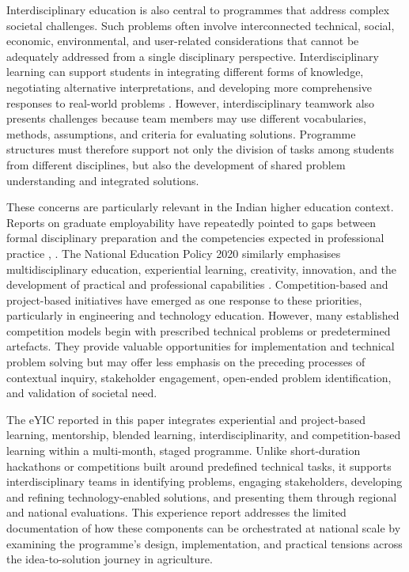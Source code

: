 \documentclass[runningheads]{llncs}
\begin{document}
Interdisciplinary education is also central to programmes that address complex societal challenges. Such problems often involve interconnected technical, social, economic, environmental, and user-related considerations that cannot be adequately addressed from a single disciplinary perspective. Interdisciplinary learning can support students in integrating different forms of knowledge, negotiating alternative interpretations, and developing more comprehensive responses to real-world problems \cite{b26}. However, interdisciplinary teamwork also presents challenges because team members may use different vocabularies, methods, assumptions, and criteria for evaluating solutions. Programme structures must therefore support not only the division of tasks among students from different disciplines, but also the development of shared problem understanding and integrated solutions.

These concerns are particularly relevant in the Indian higher education context. Reports on graduate employability have repeatedly pointed to gaps between formal disciplinary preparation and the competencies expected in professional practice \cite{b27}, \cite{b28}. The National Education Policy 2020 similarly emphasises multidisciplinary education, experiential learning, creativity, innovation, and the development of practical and professional capabilities \cite{b29}. Competition-based and project-based initiatives have emerged as one response to these priorities, particularly in engineering and technology education. However, many established competition models begin with prescribed technical problems or predetermined artefacts. They provide valuable opportunities for implementation and technical problem solving but may offer less emphasis on the preceding processes of contextual inquiry, stakeholder engagement, open-ended problem identification, and validation of societal need.

The eYIC reported in this paper integrates experiential and project-based learning, mentorship, blended learning, interdisciplinarity, and competition-based learning within a multi-month, staged programme. Unlike short-duration hackathons or competitions built around predefined technical tasks, it supports interdisciplinary teams in identifying problems, engaging stakeholders, developing and refining technology-enabled solutions, and presenting them through regional and national evaluations. This experience report addresses the limited documentation of how these components can be orchestrated at national scale by examining the programme’s design, implementation, and practical tensions across the idea-to-solution journey in agriculture.
\end{document}
